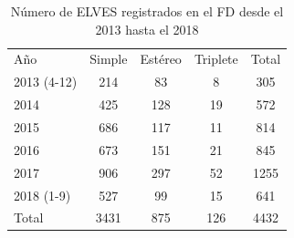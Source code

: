 \documentclass[12pt,oneside,openany,letter]{book}
\begin{document}
\begin{table}[]\centering
\caption{N\'umero de ELVES registrados en el FD desde el 2013 hasta el 2018 \cite{Mussa2019}}
\label{eventos_elves}
\begin{tabular}{lcccc}
\rowcolor[HTML]{EFEFEF} 
Año         & Simple & Estéreo & Triplete & Total                        \\
2013 (4-12) & 214    & 83      & 8        & \cellcolor[HTML]{EFEFEF}305  \\
2014        & 425    & 128     & 19       & \cellcolor[HTML]{EFEFEF}572  \\
2015        & 686    & 117     & 11       & \cellcolor[HTML]{EFEFEF}814  \\
2016        & 673    & 151     & 21       & \cellcolor[HTML]{EFEFEF}845  \\
2017        & 906    & 297     & 52       & \cellcolor[HTML]{EFEFEF}1255 \\
2018 (1-9)  & 527    & 99      & 15       & \cellcolor[HTML]{EFEFEF}641  \\
\rowcolor[HTML]{EFEFEF} 
Total       & 3431   & 875     & 126      & 4432                        
\end{tabular}
\end{table}

\end{document}
